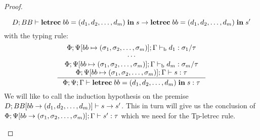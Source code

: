 \documentclass[a4paper, oneside, 10pt, draft]{memoir}
\begin{document}
\begin{proof}
\begin{itemize}
\begin{equation*}
        {D;BB |- \mathbf{letrec} \; bb = (d_1, d_2, \dotsc, d_m)\; \mathbf{in} \; s -> \mathbf{letrec} \; bb = (d_1, d_2, \dotsc, d_m)\; \mathbf{in} \; s'}
      \end{equation*}
    with the typing rule:
        \begin{equation}
          \label{eq:preserv-tp-letrec-s}
          \inference{\Phi;\Psi[bb \mapsto \bbtypes];\Gamma \tpb d_1 :
            \sigma_1 / \tau\\
            \dotsb\\
            \Phi;\Psi[bb \mapsto \bbtypes];\Gamma \tpb d_m : \sigma_m
            / \tau\\
            \Phi;\Psi[bb \mapsto \bbtypes];\Gamma |- s : \tau}
          {\Phi;\Psi;\Gamma |- \iletrec{bb}{\dbundle}{s} : \tau}\\\\
    \end{equation}
    We will like to call the induction hypothesis on the premise
    $D;BB[bb -> (d_1, d_2, \dotsc, d_m)] |- s -> s'$. This in turn will give us the
    conclusion of $\Phi;\Psi[bb -> (\sigma_1, \sigma_2, \dotsc, \sigma_m)];\Gamma |- s' : \tau$
    which we need for the Tp-letrec rule.


\end{itemize}
\end{proof}
\end{document}

